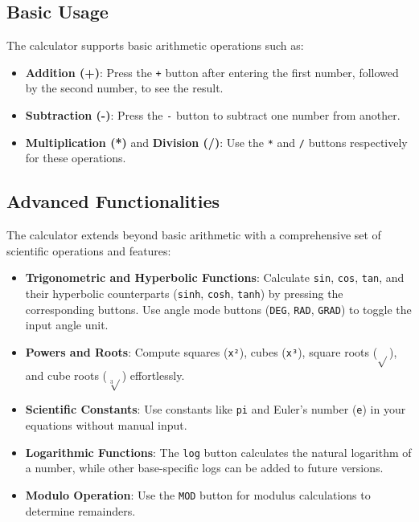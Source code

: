 \documentclass[a4paper,12pt]{article}
\begin{document}
\subsection{Basic Usage}

The calculator supports basic arithmetic operations such as:

\begin{itemize}
    \item \textbf{Addition (+)}: Press the \texttt{+} button after entering the first number, followed by the second number, to see the result.
    \item \textbf{Subtraction (-)}: Press the \texttt{-} button to subtract one number from another.
    \item \textbf{Multiplication (*)} and \textbf{Division (/)}: Use the \texttt{*} and \texttt{/} buttons respectively for these operations.
\end{itemize}

\subsection{Advanced Functionalities}

The calculator extends beyond basic arithmetic with a comprehensive set of scientific operations and features:

\begin{itemize}
    \item \textbf{Trigonometric and Hyperbolic Functions}: Calculate \texttt{sin}, \texttt{cos}, \texttt{tan}, and their hyperbolic counterparts (\texttt{sinh}, \texttt{cosh}, \texttt{tanh}) by pressing the corresponding buttons. Use angle mode buttons (\texttt{DEG}, \texttt{RAD}, \texttt{GRAD}) to toggle the input angle unit.
    \item \textbf{Powers and Roots}: Compute squares (\texttt{x²}), cubes (\texttt{x³}), square roots (\(\sqrt{}\)), and cube roots (\(\sqrt[3]{}\)) effortlessly.
    \item \textbf{Scientific Constants}: Use constants like \texttt{pi} and Euler's number (\texttt{e}) in your equations without manual input.
    \item \textbf{Logarithmic Functions}: The \texttt{log} button calculates the natural logarithm of a number, while other base-specific logs can be added to future versions.
    \item \textbf{Modulo Operation}: Use the \texttt{MOD} button for modulus calculations to determine remainders.
\end{itemize}
\end{document}

